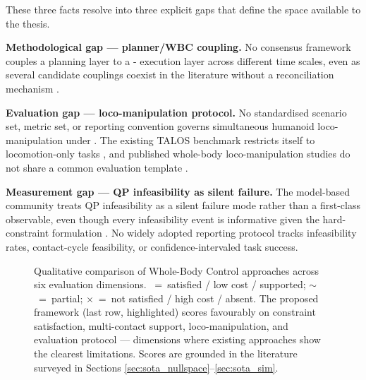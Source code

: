 These three facts resolve into three explicit gaps that define the space
available to the thesis.

\begin{researchgap}
\textbf{Methodological gap --- planner/WBC coupling.} No consensus
framework couples a planning layer to a \QP-\WBC{} execution layer
across different time scales, even as several candidate couplings
coexist in the literature without a reconciliation mechanism
\cite{Romualdi2023,Sleiman2021,Smaldone2025,LeCleach2024}.
\end{researchgap}

\begin{researchgap}
\textbf{Evaluation gap --- loco-manipulation protocol.} No standardised
scenario set, metric set, or reporting convention governs simultaneous
humanoid loco-manipulation under \WBC{}. The existing TALOS benchmark
restricts itself to locomotion-only tasks \cite{Fernbach2018}, and
published whole-body loco-manipulation studies do not share a common
evaluation template \cite{Sleiman2021}.
\end{researchgap}

\begin{researchgap}
\textbf{Measurement gap --- QP infeasibility as silent failure.} The
model-based community treats QP infeasibility as a silent failure mode
rather than a first-class observable, even though every infeasibility
event is informative given the hard-constraint formulation
\cite{Wensing2013,Koolen2016}. No widely adopted reporting protocol
tracks infeasibility rates, contact-cycle feasibility, or
confidence-intervaled task success.
\end{researchgap}


\begin{figure}[htbp]
  \centering
  \singlespacing
  
  \caption{Qualitative comparison of Whole-Body Control approaches across
           six evaluation dimensions.
           \checkmark~=~satisfied / low cost / supported;
           $\sim$~=~partial;
           $\times$~=~not satisfied / high cost / absent.
           The proposed framework (last row, highlighted) scores
           favourably on constraint satisfaction, multi-contact support,
           loco-manipulation, and evaluation protocol — dimensions where
           existing approaches show the clearest limitations.
           Scores are grounded in the literature surveyed in Sections
           \ref{sec:sota_nullspace}--\ref{sec:sota_sim}.}
  \label{fig:wbc_comparison}
\end{figure}

